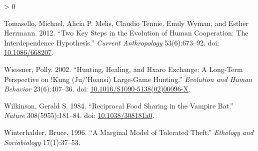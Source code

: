 \documentclass[
]{article}
\newlength{\cslhangindent}
\newenvironment{CSLReferences}[2] %
 {%
  \setlength{\parindent}{0pt}
  \ifodd #1 \everypar{\setlength{\hangindent}{\cslhangindent}}\ignorespaces\fi
  \ifnum #2 > 0
  \setlength{\parskip}{#2\baselineskip}
  \fi
 }%
 {}
\begin{document}
\begin{CSLReferences}{1}{0}
\leavevmode\hypertarget{ref-tomaselloTwoKeySteps2012}{}%
Tomasello, Michael, Alicia P. Melis, Claudio Tennie, Emily Wyman, and Esther Herrmann. 2012. {``Two {Key Steps} in the {Evolution} of {Human Cooperation}: {The Interdependence Hypothesis}.''} \emph{Current Anthropology} 53(6):673--92. doi: \href{https://doi.org/10.1086/668207}{10.1086/668207}.

\leavevmode\hypertarget{ref-wiessnerHuntingHealingHxaro2002}{}%
Wiessner, Polly. 2002. {``Hunting, Healing, and Hxaro Exchange: {A} Long-Term Perspective on !{Kung} ({Ju}/'Hoansi) Large-Game Hunting.''} \emph{Evolution and Human Behavior} 23(6):407--36. doi: \href{https://doi.org/10.1016/S1090-5138(02)00096-X}{10.1016/S1090-5138(02)00096-X}.

\leavevmode\hypertarget{ref-wilkinsonReciprocalFoodSharing1984}{}%
Wilkinson, Gerald S. 1984. {``Reciprocal Food Sharing in the Vampire Bat.''} \emph{Nature} 308(5955):181--84. doi: \href{https://doi.org/10.1038/308181a0}{10.1038/308181a0}.

\leavevmode\hypertarget{ref-winterhalder1996marginal}{}%
Winterhalder, Bruce. 1996. {``A Marginal Model of Tolerated Theft.''} \emph{Ethology and Sociobiology} 17(1):37--53.

\end{CSLReferences}
\end{document}
